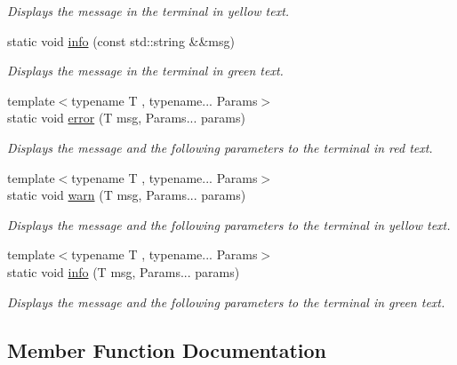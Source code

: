 \begin{DoxyCompactItemize}
\begin{DoxyCompactList}\small\item\em Displays the message in the terminal in yellow text. \end{DoxyCompactList}\item 
static void \mbox{\hyperlink{classRose_1_1Logger_a87823e875bcc3f838693af93e19c9d25}{info}} (const std\+::string \&\&msg)
\begin{DoxyCompactList}\small\item\em Displays the message in the terminal in green text. \end{DoxyCompactList}\item 
{\footnotesize template$<$typename T , typename... Params$>$ }\\static void \mbox{\hyperlink{classRose_1_1Logger_ac876e2e27367310de3aea6f9d137c0fc}{error}} (T msg, Params... params)
\begin{DoxyCompactList}\small\item\em Displays the message and the following parameters to the terminal in red text. \end{DoxyCompactList}\item 
{\footnotesize template$<$typename T , typename... Params$>$ }\\static void \mbox{\hyperlink{classRose_1_1Logger_ad5905f310c92e3878eeaa9a4afe1c7f2}{warn}} (T msg, Params... params)
\begin{DoxyCompactList}\small\item\em Displays the message and the following parameters to the terminal in yellow text. \end{DoxyCompactList}\item 
{\footnotesize template$<$typename T , typename... Params$>$ }\\static void \mbox{\hyperlink{classRose_1_1Logger_a5b25729e6095f1aec47f82540999c13b}{info}} (T msg, Params... params)
\begin{DoxyCompactList}\small\item\em Displays the message and the following parameters to the terminal in green text. \end{DoxyCompactList}\end{DoxyCompactItemize}


\subsection{Member Function Documentation}
\mbox{\label{classRose_1_1Logger_a5db9f7e908e98b211bfb841b58610530}} 
